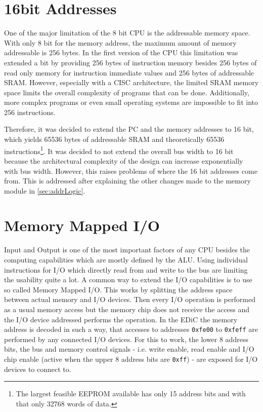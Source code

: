 \section{16bit Addresses}
One of the major limitation of the 8 bit \gls{CPU} is the addressable memory space.
With only 8 bit for the memory address, the maximum amount of memory addressable is 256 bytes.
In the first version of the \gls{CPU} this limitation was extended a bit by providing 256 bytes of instruction memory besides 256 bytes of read only memory for instruction immediate values and 256 bytes of addressable \gls{SRAM}.
However, especially with a \gls{CISC} architecture, the limited \gls{SRAM} memory space limits the overall complexity of programs that can be done.
Additionally, more complex programs or even small operating systems are impossible to fit into 256 instructions.

Therefore, it was decided to extend the \gls{PC} and the memory addresses to 16 bit, which yields 65536 bytes of addressable \gls{SRAM} and theoretically 65536 instructions\footnote{The largest feasible \gls{EEPROM} available has only 15 address bits and with that only 32768 words of data.}.
It was decided to not extend the overall bus width to 16 bit because the architectural complexity of the design can increase exponentially with bus width.
However, this raises problems of where the 16 bit addresses come from.
This is addressed after explaining the other changes made to the memory module in \cref{sec:addrLogic}.

\section{Memory Mapped I/O}
Input and Output is one of the most important factors of any \gls{CPU} besides the computing capabilities which are mostly defined by the \gls{ALU}.
Using individual instructions for I/O which directly read from and write to the bus are limiting the usability quite a lot.
A common way to extend the I/O capabilities is to use so called Memory Mapped I/O.
This works by splitting the address space between actual memory and I/O devices.
Then every I/O operation is performed as a usual memory access but the memory chip does not receive the access and the I/O device addressed performs the operation.
In the \gls{EDiC} the memory address is decoded in such a way, that accesses to addresses \texttt{0xfe00} to \texttt{0xfeff} are performed by any connected I/O devices.
For this to work, the lower 8 address bits, the bus and memory control signals - i.e. write enable, read enable and I/O chip enable (active when the upper 8 address bits are \texttt{0xff}) - are exposed for I/O devices to connect to.

